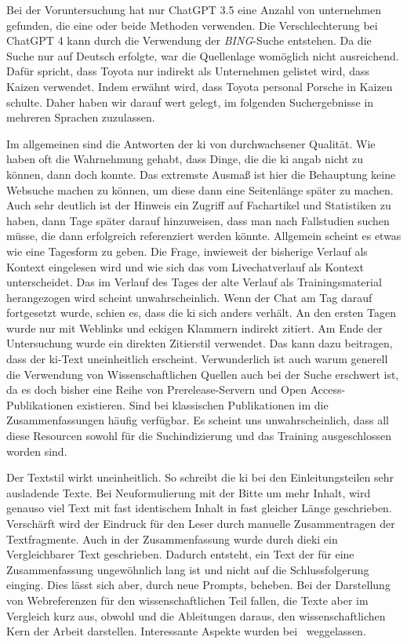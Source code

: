 
Bei der Voruntersuchung hat nur ChatGPT 3.5 eine Anzahl von unternehmen gefunden, die eine oder beide Methoden verwenden. Die Verschlechterung bei ChatGPT 4 kann durch die Verwendung der \textit{BING}-Suche entstehen. Da die Suche nur auf Deutsch erfolgte, war die Quellenlage womöglich nicht ausreichend.
Dafür spricht, dass Toyota nur indirekt als Unternehmen gelistet wird, dass Kaizen verwendet. Indem erwähnt wird, dass Toyota personal Porsche in Kaizen schulte.
Daher haben wir darauf wert gelegt, im folgenden Suchergebnisse in mehreren Sprachen zuzulassen.

Im allgemeinen sind die Antworten der \gls{ki} von durchwachsener Qualität. Wie haben oft die Wahrnehmung gehabt, dass Dinge, die die \gls{ki} angab nicht zu können, dann doch konnte. Das extremste Ausmaß ist hier die Behauptung keine Websuche machen zu können, um diese dann eine Seitenlänge später zu machen. Auch sehr deutlich ist der Hinweis ein Zugriff auf Fachartikel und Statistiken zu haben, dann Tage später darauf hinzuweisen, dass man nach Fallstudien suchen müsse, die dann erfolgreich referenziert werden könnte.
Allgemein scheint es etwas wie eine Tagesform zu geben. Die Frage, inwieweit der bisherige Verlauf als Kontext eingelesen wird und wie sich das vom Livechatverlauf als Kontext unterscheidet. Das im Verlauf des Tages der alte Verlauf als Trainingsmaterial herangezogen wird scheint unwahrscheinlich. Wenn der Chat am Tag darauf fortgesetzt wurde, schien es, dass die \gls{ki} sich anders verhält. An den ersten Tagen wurde nur mit Weblinks und eckigen Klammern indirekt zitiert. Am Ende der Untersuchung wurde ein direkten Zitierstil verwendet. Das kann dazu beitragen, dass der \gls{ki}-Text uneinheitlich erscheint.
Verwunderlich ist auch warum generell die Verwendung von Wissenschaftlichen Quellen auch bei der Suche erschwert ist, da es doch bisher eine Reihe von Prerelease-Servern und Open Access-Publikationen existieren. Sind bei klassischen Publikationen im die Zusammenfassungen häufig verfügbar. Es scheint uns unwahrscheinlich, dass all diese Resourcen sowohl für die Suchindizierung und das Training ausgeschlossen worden sind.

Der Textstil wirkt uneinheitlich. So schreibt die \gls{ki} bei den Einleitungsteilen sehr ausladende Texte. Bei Neuformulierung mit der Bitte um mehr Inhalt, wird genauso viel Text mit fast identischem Inhalt in fast gleicher Länge geschrieben. Verschärft wird der Eindruck für den Leser durch manuelle Zusammentragen der Textfragmente. 
Auch in der Zusammenfassung wurde durch die\gls{ki} ein Vergleichbarer Text geschrieben. Dadurch entsteht, ein Text der für eine Zusammenfassung ungewöhnlich lang ist und nicht auf die Schlussfolgerung einging. Dies lässt sich aber, durch neue Prompts, beheben. Bei der Darstellung von Webreferenzen für den wissenschaftlichen Teil fallen, die Texte aber im Vergleich kurz aus, obwohl und die Ableitungen daraus, den wissenschaftlichen Kern der Arbeit darstellen. Interessante Aspekte wurden bei~\cite{ibscmr2003toyotakaizen} weggelassen.
 

